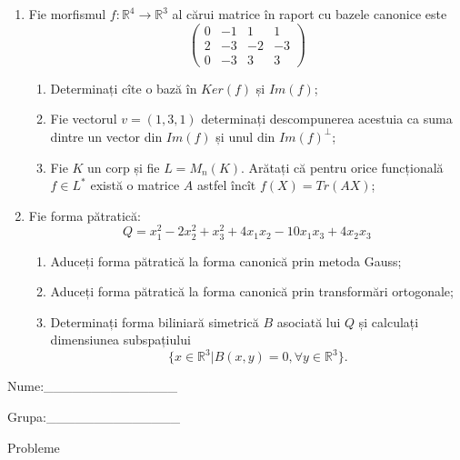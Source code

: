 \documentclass{article}
\begin{document}
\begin{enumerate}
 \item Fie morfismul $f:\mathbb{R}^4 \to \mathbb{R}^3$ al cărui matrice în raport cu bazele canonice este
$$\begin{pmatrix}
0&-1&1&1\\
2&-3&-2&-3\\
0&-3&3&3
\end{pmatrix}$$

\begin{enumerate}
\item Determinați cîte o bază în $Ker(f)$ și $Im(f)$;
\item Fie vectorul $v=(1,3,1)$ determinați descompunerea acestuia ca suma dintre un vector din $Im(f)$ și unul din $Im(f)^\perp$;
\item Fie $K$ un corp și fie $L=M_n(K)$. Arătați că pentru orice funcțională $f \in L^*$ există o matrice $A$ astfel încît $f(X)=Tr(AX)$;
\end{enumerate}
\item Fie forma pătratică:
$$Q= x_1^2-2x_2^2+x_3^2+4x_1x_2-10x_1x_3+4x_2x_3$$

\begin{enumerate}
\item Aduceți forma pătratică la forma canonică prin metoda Gauss;
\item Aduceți forma pătratică la forma canonică prin transformări ortogonale;
\item Determinați forma biliniară simetrică $B$ asociată lui $Q$ și calculați dimensiunea subspațiului
$$\{x \in \mathbb{R}^3 | B(x,y)=0,\forall y \in \mathbb{R}^3\}.$$

\end{enumerate}
\end{enumerate}
\newpage
\begin{flushright}
Nume:\_\_\_\_\_\_\_\_\_\_\_\_\_\_
 
 
Grupa:\_\_\_\_\_\_\_\_\_\_\_\_\_\_
\end{flushright}
\begin{center}
\vspace{2cm}
{\Large Probleme}
\vspace{2cm}
\end{center}
\end{document}
